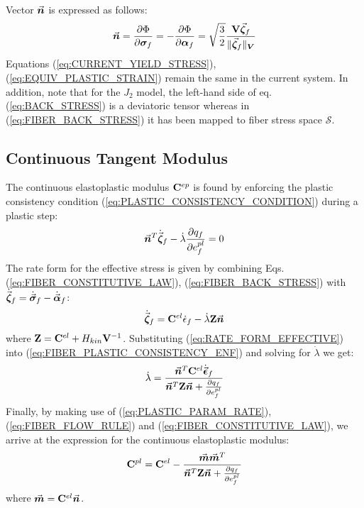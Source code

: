 \noindent Vector $\vec{\bm{n}}$ is expressed as follows:
\begin{equation}
	\vec{\bm{n}} =  \frac{\partial \Phi}{\partial \bm{\sigma}_f} = 
	- \frac{\partial \Phi}{\partial \bm{\alpha}_f} =
	\sqrt{\frac{3}{2}}\frac{\mathbf{V}\vec{\bm{\zeta}}_f}{\Vert\vec{\bm{\zeta}}_f\Vert_{\bm{V}}}
	\label{eq:VECTOR_n}
\end{equation}
Equations (\ref{eq:CURRENT_YIELD_STRESS}), (\ref{eq:EQUIV_PLASTIC_STRAIN})
remain the same in the current system. In addition, note that for the 
$J_2$ model, the left-hand side of eq. (\ref{eq:BACK_STRESS}) is a deviatoric 
tensor whereas in (\ref{eq:FIBER_BACK_STRESS}) it has been mapped to fiber 
stress space $\mathcal{S}$.


\subsection{Continuous Tangent Modulus}\label{section:CH3-S3SS2}

The continuous elastoplastic modulus $\mathbf{C}^{ep}$ is found by enforcing the
plastic consistency condition (\ref{eq:PLASTIC_CONSISTENCY_CONDITION}) during a 
plastic step:
\begin{equation}
	\vec{\bm{n}}^T\dot{\vec{\bm{\zeta}}}_f-\dot{\lambda}\frac{\partial q_f}{\partial
		e_f^{pl}} = 0
	\label{eq:FIBER_PLASTIC_CONSISTENCY_ENF}
\end{equation}
The rate form for the effective stress is given by combining Eqs.
(\ref{eq:FIBER_CONSTITUTIVE_LAW}), (\ref{eq:FIBER_BACK_STRESS}) with
$\dot{\vec{\bm{\zeta}}}_f = \dot{\vec{\bm{\sigma}}}_f - \dot{\vec{\bm{\alpha}}}_f$:
\begin{equation}
	\dot{\vec{\bm{\zeta}}}_f = \mathbf{C}^{el}\dot{\epsilon}_f -
	\dot{\lambda}\mathbf{Z}\vec{\bm{n}}
	\label{eq:RATE_FORM_EFFECTIVE}
\end{equation}
\noindent where $\mathbf{Z} = \mathbf{C}^{el}+H_{kin}\mathbf{V}^{-1}$.
Substituting (\ref{eq:RATE_FORM_EFFECTIVE}) into
(\ref{eq:FIBER_PLASTIC_CONSISTENCY_ENF}) and solving for $\dot{\lambda}$ we get:
\begin{equation}
	\dot{\lambda} =
	\frac{\vec{\bm{n}}^T\mathbf{C}^{el}\dot{\vec{\bm{\epsilon}}}_f}{\vec{\bm{n}}^T\mathbf{Z}\vec{\bm{n}}+
		\frac{\partial q_f}{\partial e_f^{pl}}}
	\label{eq:PLASTIC_PARAM_RATE}
\end{equation}
Finally, by making use of (\ref{eq:PLASTIC_PARAM_RATE}),
(\ref{eq:FIBER_FLOW_RULE}) and (\ref{eq:FIBER_CONSTITUTIVE_LAW}), we arrive at
the expression for the continuous elastoplastic modulus:
\begin{equation}
	\mathbf{C}^{pl} =
	\mathbf{C}^{el}-\frac{\vec{\bm{m}}\vec{\bm{m}}^T}{\vec{\bm{n}}^T\mathbf{Z}\vec{\bm{n}}+
		\frac{\partial q_f}{\partial e_f^{pl}}}
	\label{eq:CONT_ELASTOPLASTIC_MODULUS}
\end{equation}
\noindent where $\vec{\bm{m}} = \mathbf{C}^{el}\vec{\bm{n}}$.

